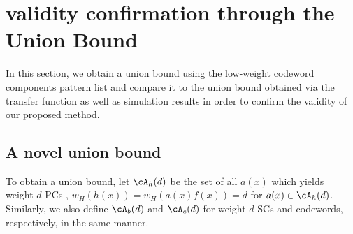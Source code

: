 \section{validity confirmation through the Union Bound}
\label{sec4}


 In this section, we obtain a union bound using the low-weight codeword components pattern list and compare it to the union bound obtained via the transfer function as well as simulation results in order to confirm the validity of our proposed method.

\subsection{A novel union bound}
To obtain a union bound, let $\cA_h(d)$ be the set of all $a(x)$ which yields weight-$d$ PCs \ie, $w_H(h(x))=w_H(a(x)f(x))=d$ for $a(x) \in \cA_h(d)$. Similarly, we also define $\cA_b(d)$ and $\cA_c(d)$ for weight-$d$ SCs and codewords, respectively, in the same manner.

